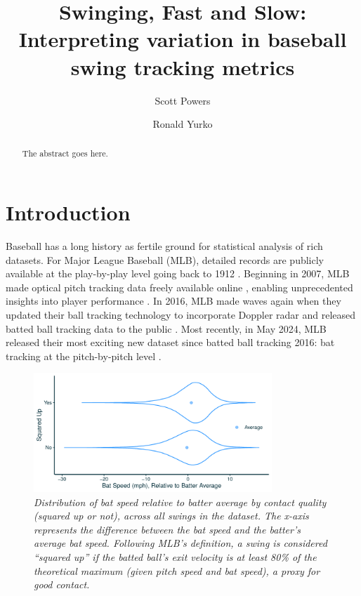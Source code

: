 \documentclass{article}
\title{Swinging, Fast and Slow:\\Interpreting variation in baseball swing tracking metrics}
\author[1]{Scott Powers}
\author[2]{Ronald Yurko}
\affil[1]{Department of Sport Management, Rice University}
\affil[2]{Department of Statistics \& Data Science, Carnegie Mellon University}
\begin{document}
  \maketitle
	
  \begin{abstract}
    The abstract goes here.
  \end{abstract}

  \section{Introduction}
  \label{sec:introduction}

    Baseball has a long history as fertile ground for statistical analysis of rich datasets. For Major League Baseball (MLB), detailed records are publicly available at the play-by-play level going back to 1912 \citep{retrosheet}. Beginning in 2007, MLB made optical pitch tracking data freely available online
    \citep{fast_what_2010}, enabling unprecedented insights into player performance \citep{swartz_quality_2017}. In 2016, MLB made waves again when they updated their ball tracking technology to incorporate Doppler radar and released batted ball tracking data to the public \citep{arthur_new_2016}. Most recently, in May 2024, MLB released their most exciting new dataset since batted ball tracking 2016: bat tracking at the pitch-by-pitch level \citep{petriello_everything_2024}.

    \begin{figure}
      \centering
      \includegraphics[width = 0.8\textwidth]{../../figures/counterintuitive.pdf}
      \caption{\it Distribution of bat speed relative to batter average by contact quality (squared up or not), across all swings in the dataset. The x-axis represents the difference between the bat speed and the batter's average bat speed. Following MLB's definition, a swing is considered ``squared up'' if the batted ball's exit velocity is at least 80\% of the theoretical maximum (given pitch speed and bat speed), a proxy for good contact.}
      \label{fig:counterintuitive}
    \end{figure}
\end{document}
